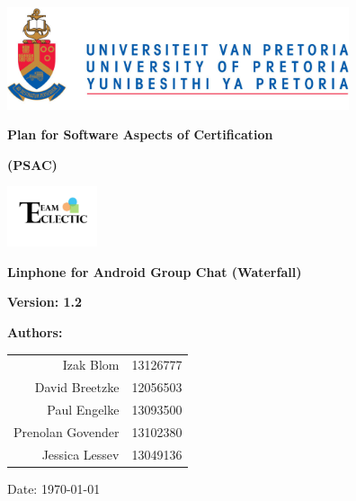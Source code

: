 \begin{titlepage}
\begin{flushright}

\includegraphics[width=380px]{../global/University_of_Pretoria_Logo.png}
\newline
\newline

\textbf {\LARGE Plan for Software Aspects of Certification} \newline

\textbf {\Large (PSAC)} \newline

\centering\includegraphics[width=100px]{../global/Logo.jpg}

\textbf {\Large Linphone for Android Group Chat (Waterfall)}\newline

\flushright \textbf {\large Version: 1.2}\newline

\centering \textbf {\large Authors:}

\begin{table}[H]
\large
\centering
\begin{tabular}{rl}
	Izak Blom & 13126777 \\
	David Breetzke & 12056503 \\
	Paul Engelke & 13093500 \\
	Prenolan Govender & 13102380 \\
	Jessica Lessev & 13049136 \\
\end{tabular}
\end{table}

Date: \today

\end{flushright}
\end{titlepage}